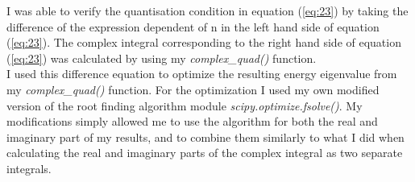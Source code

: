 \documentclass[10pt, a4paper, singlespacing]{report}
\begin{document}
I was able to verify the quantisation condition in equation (\ref{eq:23}) by taking the difference of the expression dependent of n in the left hand side of equation (\ref{eq:23}). The complex integral corresponding to the right hand side of equation (\ref{eq:23}) was calculated by using my \emph{complex\_quad()} function. \\I used this difference equation to optimize the resulting energy eigenvalue from my \emph{complex\_quad()} function. For the optimization I used my own modified version of the root finding algorithm module \emph{scipy.optimize.fsolve()}. My modifications simply allowed me to use the algorithm for both the real and imaginary part of my results, and to combine them similarly to what I did when calculating the real and imaginary parts of the complex integral as two separate integrals.
\end{document}
